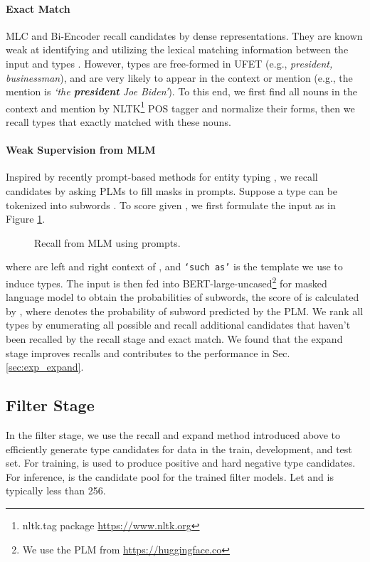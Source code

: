 \documentclass[11pt]{article}
\begin{document}
\paragraph{Exact Match} MLC and Bi-Encoder recall candidates by dense representations. They are known weak at identifying and utilizing the lexical matching information between the input and types \cite{matching_info1, matching_info2}. However, 
 types are free-formed in UFET (e.g., \textit{president, businessman}), and are very likely to appear in the context or mention (e.g., the mention is \textit{`the \textbf{president} Joe Biden'}). To this end, we first find all nouns in the context and mention by NLTK\footnote{nltk.tag package \url{https://www.nltk.org}} POS tagger and normalize their forms, then we recall types that exactly matched with these nouns.
\paragraph{Weak Supervision from MLM} Inspired by recently prompt-based methods for entity typing \cite{ding2021prompt, dfet}, we recall candidates by asking PLMs to fill masks in prompts. Suppose a type  can be tokenized into  subwords . To score  given , we first formulate the input as in Figure \ref{fig:prompt_recall}.
\begin{figure}[h]
    \centering
    \caption{Recall from MLM using prompts.}
    \label{fig:prompt_recall}
\end{figure}
where  are left and right context of , and \texttt{`such as'} is the template we use to induce types. The input is then fed into BERT-large-uncased\footnote{We use the PLM from \url{https://huggingface.co}} for masked language model to obtain the probabilities of subwords, the score of  is calculated by , where  denotes the probability of subword  predicted by the PLM. We rank all types by enumerating all possible  and recall  additional candidates that haven't been recalled by the recall stage and exact match. We found that the expand stage improves recalls and contributes to the performance in Sec. \ref{sec:exp_expand}.
\subsection{Filter Stage}
In the filter stage, we use the recall and expand method introduced above to efficiently generate type candidates  for data in the train, development, and test set. For training,  is used to produce positive and hard negative type candidates. For inference,  is the candidate pool for the trained filter models. Let  and  is typically less than 256. 
\end{document}
